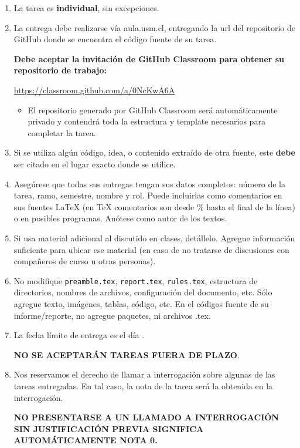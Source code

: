 \begin{enumerate}[(1)]
  \item
    La tarea es \textbf{individual}, sin excepciones.
  \item
    La entrega debe realizarse vía aula.usm.cl, entregando la url del repositorio de GitHub donde se encuentra el código fuente de su tarea. 
    
    \textbf{Debe aceptar la invitación de GitHub Classroom para obtener su repositorio de trabajo:}
    \begin{center}
      \url{https://classroom.github.com/a/0NcKwA6A}
          
  \end{center}
  \begin{itemize}
      
  \item El repositorio generado por GitHub Classroom será automáticamente privado y contendrá toda la estructura y template necesarios para completar la tarea.

  \end{itemize}
  \item Si se utiliza algún código, idea, o contenido extraído de otra fuente, este \textbf{debe} ser citado en el lugar exacto donde se utilice. 
  \item
  Asegúrese que todas sus entregas tengan sus datos completos:
  número de la tarea, ramo, semestre, nombre y rol.
  Puede incluirlas como comentarios en sus fuentes \LaTeX{}
  (en \TeX{} comentarios son desde \% hasta el final de la línea)
  o en posibles programas.
  Anótese como autor de los textos.
  \item
    Si usa material adicional al discutido en clases,
    detállelo.
    Agregue información suficiente para ubicar ese material
    (en caso de no tratarse de discusiones con compañeros de curso
     u otras personas).
    \item No modifique \texttt{preamble.tex}, \texttt{report.tex}, \texttt{rules.tex}, estructura de directorios, nombres de archivos, configuración del documento, etc. Sólo agregue texto, imágenes, tablas, código, etc. En el códigos fuente de su informe/reporte, no agregue paquetes, ni archivos .tex.
  \item
    La fecha límite de entrega es el día \tcm{\deadline}.
    \begin{center}
        \Large{
          \textbf{NO SE ACEPTARÁN TAREAS FUERA DE PLAZO}.
        }
        \normalsize
    \end{center}
     
    
  \item
    Nos reservamos el derecho de llamar a interrogación
    sobre algunas de las tareas entregadas.
    En tal caso,
    la nota de la tarea será la obtenida en la interrogación.
    \begin{center}
      \Large{
        \textbf{NO PRESENTARSE A UN LLAMADO A INTERROGACIÓN SIN JUSTIFICACIÓN PREVIA SIGNIFICA AUTOMÁTICAMENTE NOTA 0.}
      }
    \end{center}
    
  \end{enumerate}